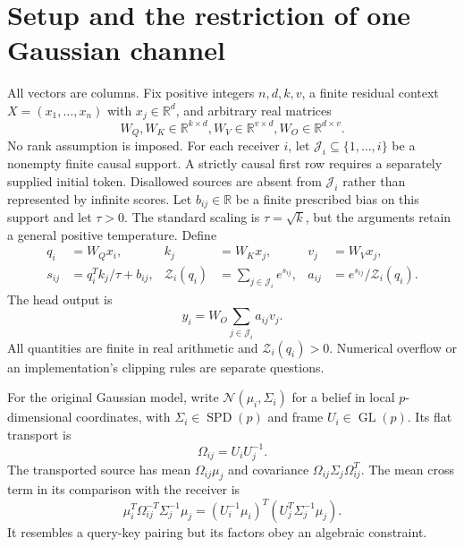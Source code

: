 \documentclass[11pt]{article}
\newcommand{\R}{\mathbb{R}}
\newcommand{\SPD}{\operatorname{SPD}}
\newcommand{\GL}{\operatorname{GL}}
\begin{document}
\section{Setup and the restriction of one Gaussian channel}
\label{sec:setup}
All vectors are columns. Fix positive integers $n,d,k,v$, a finite residual context $X=(x_1,\ldots,x_n)$ with $x_j\in\R^d$, and arbitrary real matrices
\begin{equation}
W_Q,W_K\in\R^{k\times d},
W_V\in\R^{v\times d}, W_O\in\R^{d\times v}.
\label{eq:shapes}
\end{equation}
No rank assumption is imposed. For each receiver $i$, let $\mathcal J_i\subseteq\{1,\ldots,i\}$ be a nonempty finite causal support. A strictly causal first row requires a separately supplied initial token. Disallowed sources are absent from $\mathcal J_i$ rather than represented by infinite scores. Let $b_{ij}\in\R$ be a finite prescribed bias on this support and let $\tau>0$. The standard scaling is $\tau=\sqrt{k}$, but the arguments retain a general positive temperature. Define
\begin{align}
q_i&=W_Qx_i,& k_j&=W_Kx_j,& v_j&=W_Vx_j,\\
s_{ij}&=q_i^Tk_j/\tau+b_{ij},&
\mathcal Z_i(q_i)&=\sum_{j\in\mathcal J_i}e^{s_{ij}},&
a_{ij}&=e^{s_{ij}}/\mathcal Z_i(q_i).
\label{eq:head-definitions}
\end{align}
The head output is
\begin{equation}
y_i=W_O\sum_{j\in\mathcal J_i}a_{ij}v_j.
\label{eq:head-output}
\end{equation}
All quantities are finite in real arithmetic and $\mathcal Z_i(q_i)>0$. Numerical overflow or an implementation's clipping rules are separate questions.

For the original Gaussian model, write $\mathcal N(\mu_i,\Sigma_i)$ for a belief in local $p$-dimensional coordinates, with $\Sigma_i\in\SPD(p)$ and frame $U_i\in\GL(p)$. Its flat transport is
\begin{equation}
\Omega_{ij}=U_iU_j^{-1}.
\label{eq:flat-transport}
\end{equation}
The transported source has mean $\Omega_{ij}\mu_j$ and covariance $\Omega_{ij}\Sigma_j\Omega_{ij}^T$. The mean cross term in its comparison with the receiver is
\begin{equation}
\mu_i^T\Omega_{ij}^{-T}\Sigma_j^{-1}\mu_j
=(U_i^{-1}\mu_i)^T(U_j^T\Sigma_j^{-1}\mu_j).
\label{eq:old-cross-term}
\end{equation}
It resembles a query-key pairing but its factors obey an algebraic constraint.
\end{document}
